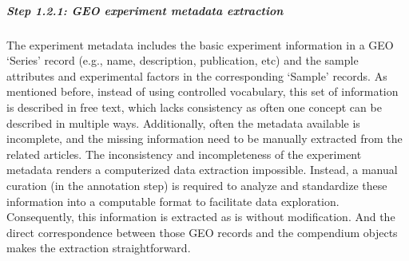 \subparagraph{Step 1.2.1: GEO experiment metadata extraction}
%
The experiment metadata includes the basic experiment information in a GEO 
`Series' record (e.g., name, description, publication, etc) and the sample 
attributes and experimental factors in the corresponding `Sample' records.
%
As mentioned before, instead of using controlled vocabulary, this set of
information is described in free text, which lacks consistency as often one
concept can be described in multiple ways.
%
Additionally, often the metadata available is incomplete, and the missing
information need to be manually extracted from the related articles.
%
The inconsistency and incompleteness of the experiment metadata renders a
computerized data extraction impossible.  Instead, a manual curation (in the
annotation step) is required to analyze and standardize these information into
a computable format to facilitate data exploration.
%
Consequently, this information is extracted as is without modification.
%
And the direct correspondence between those GEO records and the compendium
objects makes the extraction straightforward.







